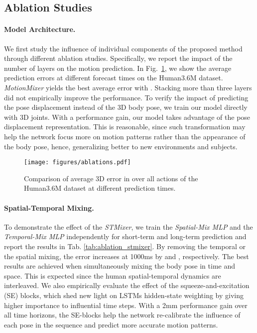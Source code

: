 \documentclass{article}
\begin{document}
\subsection{Ablation Studies}



\paragraph{Model Architecture.}
We first study the influence of individual components of the proposed method through different ablation studies. Specifically, we report the impact of the number of layers  on the motion prediction. In Fig.~\ref{fig:ablation}, we show the average prediction errors at different forecast times on the Human3.6M dataset. \textit{MotionMixer} yields the best average error with . Stacking more than three layers did not empirically improve the performance. To verify the impact of predicting the pose displacement instead of the 3D body pose, we train our model directly with 3D joints. With a  performance gain, our model takes advantage of the pose displacement representation. This is reasonable, since such transformation may help the network focus more on motion patterns rather than the appearance of the body pose, hence, generalizing better to new environments and subjects.

\begin{figure} [ht] 
    \centering
    \vspace{-0.1in}
    \texttt{[image: figures/ablations.pdf]}
    \caption{Comparison of average 3D error in  over all actions of the Human3.6M dataset at different prediction times.}
    \label{fig:ablation}
\end{figure}


\paragraph{Spatial-Temporal Mixing.} To demonstrate the effect of the \textit{STMixer}, we train the \textit{Spatial-Mix MLP} and the \textit{Temporal-Mix MLP} independently for short-term and long-term prediction and report the results in Tab. \ref{tab:ablation_stmixer}. By removing the temporal or the spatial mixing, the error increases at 1000ms by  and , respectively. The best results are achieved when simultaneously mixing the body pose in time and space. This is expected since the human spatial-temporal dynamics are interleaved. We also empirically evaluate the effect of the squeeze-and-excitation (SE) blocks, which shed new light on LSTMs hidden-state weighting by giving higher importance to influential time steps. With a 2mm performance gain over all time horizons, the SE-blocks help the network re-calibrate the influence of each pose in the sequence and predict more accurate motion patterns. 
\end{document}
